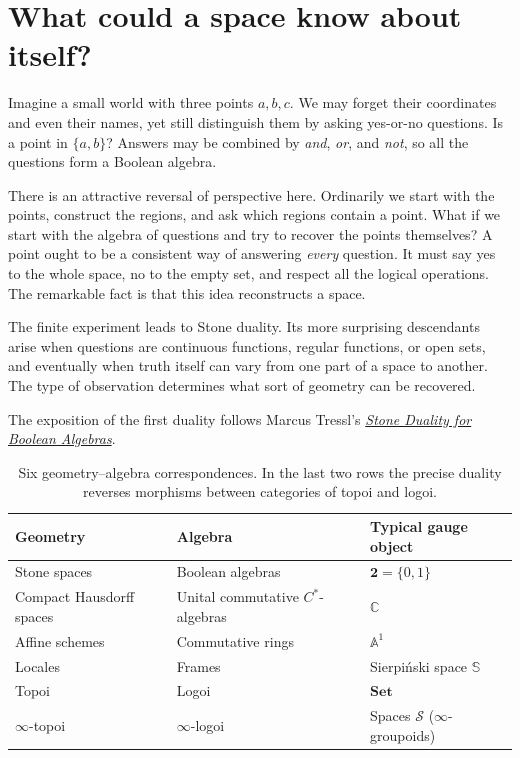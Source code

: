 

\section{What could a space know about itself?}

Imagine a small world with three points $a,b,c$. We may forget their coordinates and even their names, yet still distinguish them by asking yes-or-no questions. Is a point in $\{a,b\}$? Answers may be combined by \emph{and}, \emph{or}, and \emph{not}, so all the questions form a Boolean algebra.

There is an attractive reversal of perspective here. Ordinarily we start with the points, construct the regions, and ask which regions contain a point. What if we start with the algebra of questions and try to recover the points themselves? A point ought to be a consistent way of answering \emph{every} question. It must say yes to the whole space, no to the empty set, and respect all the logical operations. The remarkable fact is that this idea reconstructs a space.

The finite experiment leads to Stone duality. Its more surprising descendants arise when questions are continuous functions, regular functions, or open sets, and eventually when truth itself can vary from one part of a space to another. The type of observation determines what sort of geometry can be recovered.

The exposition of the first duality follows Marcus Tressl's \href{https://personalpages.manchester.ac.uk/staff/marcus.tressl/papers/StoneDualityBooleanAlgebras.pdf}{\emph{Stone Duality for Boolean Algebras}}.


\begin{table}[H]
\centering
\small
\renewcommand{\arraystretch}{1.25}
\begin{tabular}{@{}>{\raggedright\arraybackslash}p{}>{\raggedright\arraybackslash}p{}>{\raggedright\arraybackslash}p{}@{}}
\toprule
Geometry & Algebra & Typical gauge object\\
\midrule
Stone spaces & Boolean algebras & $\mathbf2=\{0,1\}$\\
Compact Hausdorff spaces & Unital commutative $C^*$-algebras & $\mathbb C$\\
Affine schemes & Commutative rings & $\mathbb A^1$\\
Locales & Frames & Sierpi\'nski space $\mathbb S$\\
Topoi & Logoi & $\mathbf{Set}$\\
$\infty$-topoi & $\infty$-logoi & Spaces $\mathcal S$ ($\infty$-groupoids)\\
\bottomrule
\end{tabular}
\caption{Six geometry--algebra correspondences. In the last two rows the precise duality reverses morphisms between categories of topoi and logoi.}
\end{table}

